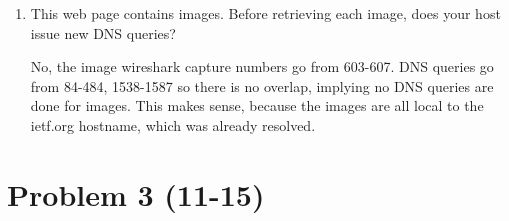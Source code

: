 \documentclass[letter,10pt]{article}
\begin{document}
\begin{enumerate}
\begin{lstlisting}[breaklines]
\end{lstlisting}

\item This web page contains images. Before retrieving each image, does your host
issue new DNS queries? 

No, the image wireshark capture numbers go from 603-607. DNS queries go from 84-484, 1538-1587 so there is no overlap, implying no DNS queries are done for images. This makes sense, because the images are all local to the ietf.org hostname, which was already resolved.

\end{enumerate}

\section{Problem 3 (11-15)}
\end{document}

